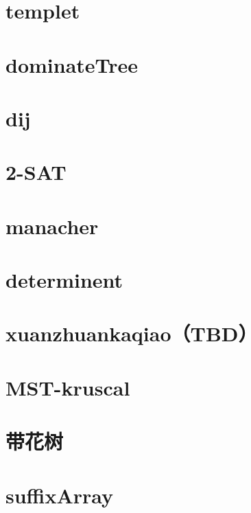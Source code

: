 \section{templet}

\section{dominateTree}

\section{dij}

\section{2-SAT}

\section{manacher}

\section{determinent}

\section{xuanzhuankaqiao（TBD）}

\section{MST-kruscal}

\section{带花树}

\section{suffixArray}

